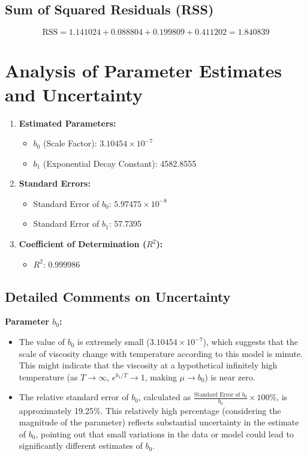 \documentclass{article}
\begin{document}
\subsection*{Sum of Squared Residuals (RSS)}
\[
\text{RSS} = 1.141024 + 0.088804 + 0.199809 + 0.411202 = 1.840839
\]


\section*{Analysis of Parameter Estimates and Uncertainty}

\begin{enumerate}
    \item \textbf{Estimated Parameters:}
    \begin{itemize}
        \item \(b_0\) (Scale Factor): \(3.10454 \times 10^{-7}\)
        \item \(b_1\) (Exponential Decay Constant): 4582.8555
    \end{itemize}
    
    \item \textbf{Standard Errors:}
    \begin{itemize}
        \item Standard Error of \(b_0\): \(5.97475 \times 10^{-8}\)
        \item Standard Error of \(b_1\): 57.7395
    \end{itemize}
    
    \item \textbf{Coefficient of Determination (\(R^2\)):}
    \begin{itemize}
        \item \(R^2\): 0.999986
    \end{itemize}
\end{enumerate}

\subsection*{Detailed Comments on Uncertainty}

\textbf{Parameter \(b_0\):}
\begin{itemize}
    \item The value of \(b_0\) is extremely small (\(3.10454 \times 10^{-7}\)), which suggests that the scale of viscosity change with temperature according to this model is minute. This might indicate that the viscosity at a hypothetical infinitely high temperature (as \(T \rightarrow \infty\), \(e^{b_1/T} \rightarrow 1\), making \(\mu \rightarrow b_0\)) is near zero.
    \item The relative standard error of \(b_0\), calculated as \(\frac{\text{Standard Error of } b_0}{b_0} \times 100\%\), is approximately 19.25\%. This relatively high percentage (considering the magnitude of the parameter) reflects substantial uncertainty in the estimate of \(b_0\), pointing out that small variations in the data or model could lead to significantly different estimates of \(b_0\).
\end{itemize}
\end{document}
